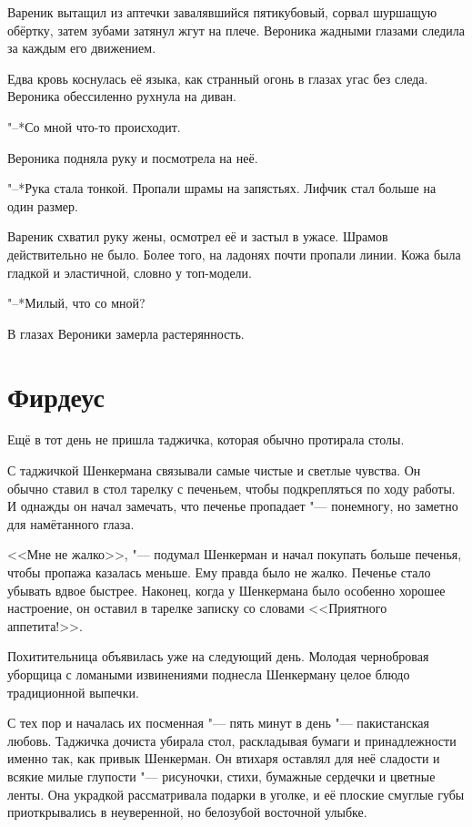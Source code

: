 Вареник вытащил из аптечки завалявшийся пятикубовый, сорвал шуршащую обёртку, затем зубами затянул жгут на плече.
Вероника жадными глазами следила за каждым его движением.

Едва кровь коснулась её языка, как странный огонь в глазах угас без следа.
Вероника обессиленно рухнула на диван.

"--*Со мной что-то происходит.

Вероника подняла руку и посмотрела на неё.

"--*Рука стала тонкой.
Пропали шрамы на запястьях.
Лифчик стал больше на один размер.

Вареник схватил руку жены, осмотрел её и застыл в ужасе.
Шрамов действительно не было.
Более того, на ладонях почти пропали линии.
Кожа была гладкой и эластичной, словно у топ-модели.

"--*Милый, что со мной?

В глазах Вероники замерла растерянность.

\section{Фирдеус}

Ещё в тот день не пришла таджичка, которая обычно протирала столы.

С таджичкой Шенкермана связывали самые чистые и светлые чувства.
Он обычно ставил в стол тарелку с печеньем, чтобы подкрепляться по ходу работы.
И однажды он начал замечать, что печенье пропадает "--- понемногу, но заметно для намётанного глаза.

<<Мне не жалко>>, "--- подумал Шенкерман и начал покупать больше печенья, чтобы пропажа казалась меньше.
Ему правда было не жалко.
Печенье стало убывать вдвое быстрее.
Наконец, когда у Шенкермана было особенно хорошее настроение, он оставил в тарелке записку со словами <<Приятного аппетита!>>.

Похитительница объявилась уже на следующий день.
Молодая чернобровая уборщица с ломаными извинениями поднесла Шенкерману целое блюдо традиционной выпечки.

С тех пор и началась их посменная "--- пять минут в день "--- пакистанская любовь.
Таджичка дочиста убирала стол, раскладывая бумаги и принадлежности именно так, как привык Шенкерман.
Он втихаря оставлял для неё сладости и всякие милые глупости "--- рисуночки, стихи, бумажные сердечки и цветные ленты.
Она украдкой рассматривала подарки в уголке, и её плоские смуглые губы приоткрывались в неуверенной, но белозубой восточной улыбке.

